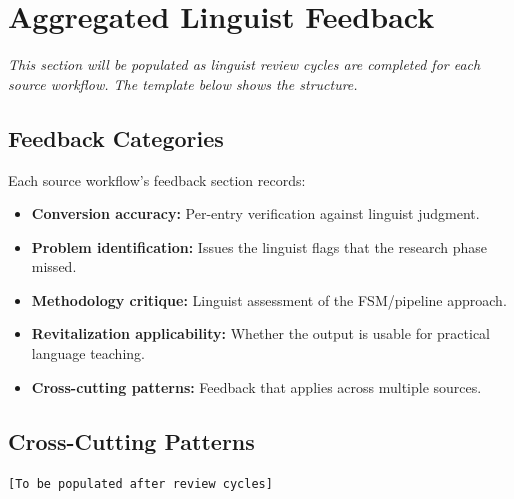 
\section{Aggregated Linguist Feedback}
\label{sec:feedback}

\textit{This section will be populated as linguist review cycles are completed
for each source workflow. The template below shows the structure.}

\subsection{Feedback Categories}

Each source workflow's feedback section records:

\begin{itemize}
  \item \textbf{Conversion accuracy:} Per-entry verification against linguist
    judgment.
  \item \textbf{Problem identification:} Issues the linguist flags that the
    research phase missed.
  \item \textbf{Methodology critique:} Linguist assessment of the FSM/pipeline
    approach.
  \item \textbf{Revitalization applicability:} Whether the output is usable
    for practical language teaching.
  \item \textbf{Cross-cutting patterns:} Feedback that applies across multiple
    sources.
\end{itemize}

\subsection{Cross-Cutting Patterns}

\texttt{[To be populated after review cycles]}
